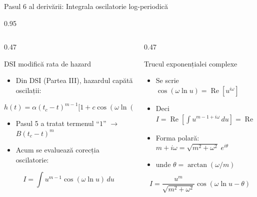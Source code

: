 \documentclass[9pt, aspectratio=169, t]{beamer}
\begin{document}
\begin{frame}{Pasul 6 al derivării: Integrala oscilatorie log-periodică}
    \begin{cminipage}{0.95\textwidth}
    {\footnotesize
    \begin{columns}[T]
        \begin{column}{0.47\textwidth}
            \begin{block}{DSI modifică rata de hazard}
                \begin{itemize}\setlength{\itemsep}{0pt}
                    \item Din DSI (Partea III), hazardul capătă oscilații:
                \end{itemize}
                \vspace{-2mm}
                $$h(t) = \alpha(t_c{-}t)^{m-1}\bigl[1 + c\cos(\omega\ln(t_c{-}t) {-} \phi')\bigr]$$
                \vspace{-4mm}
                \begin{itemize}\setlength{\itemsep}{0pt}
                    \item Pasul 5 a tratat termenul ``$1$'' $\to$ $B(t_c{-}t)^m$
                    \item Acum se evaluează corecția oscilatorie:
                \end{itemize}
                \vspace{-2mm}
                $$I = \int u^{m-1}\cos(\omega\ln u)\,du$$
            \end{block}
        \end{column}
        \begin{column}{0.47\textwidth}
            \begin{alertblock}{Trucul exponențialei complexe}
                \begin{itemize}\setlength{\itemsep}{0pt}
                    \item Se scrie $\cos(\omega\ln u) = \operatorname{Re}[u^{i\omega}]$
                    \item Deci $I = \operatorname{Re}\!\left[\int u^{m-1+i\omega}\,du\right] = \operatorname{Re}\!\left[\frac{u^{m+i\omega}}{m+i\omega}\right]$
                    \item Forma polară: $m + i\omega = \sqrt{m^2+\omega^2}\;e^{i\theta}$
                    \item unde $\theta = \arctan(\omega/m)$
                \end{itemize}
                \vspace{-2mm}
                $$\boxed{I = \frac{u^m}{\sqrt{m^2+\omega^2}}\cos(\omega\ln u - \theta)}$$

\end{alertblock}
\end{column}
\end{columns}}
\end{cminipage}
\end{frame}
\end{document}
